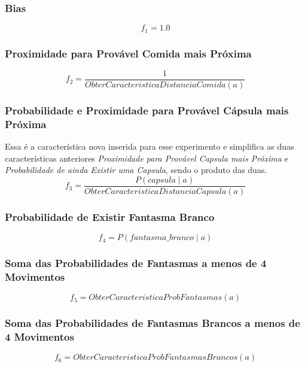 \subsubsection*{Bias}
$$ f_1 = 1.0 $$

\subsubsection*{Proximidade para Provável Comida mais Próxima}
$$ f_2 = \frac{1}{ObterCaracteristicaDistanciaComida \left( a \right)} $$

\subsubsection*{Probabilidade e Proximidade para Provável Cápsula mais Próxima }

Essa é a característica nova inserida para esse experimento e simplifica as duas características anteriores \textit{Proximidade para Provável Capsula mais Próxima} e \textit{Probabilidade de ainda Existir uma Capsula}, sendo o produto das duas.
$$ f_3 = \frac{P \left( capsula \mid a \right)}{ObterCaracteristicaDistanciaCapsula \left( a \right)} $$

\subsubsection*{Probabilidade de Existir Fantasma Branco}
$$ f_4 = P \left( fantasma\_branco \mid a \right) $$

\subsubsection*{Soma das Probabilidades de Fantasmas a menos de 4 Movimentos}
$$ f_5 = ObterCaracteristicaProbFantasmas \left( a \right) $$

\subsubsection*{Soma das Probabilidades de Fantasmas Brancos a menos de 4 Movimentos}
$$ f_6 = ObterCaracteristicaProbFantasmasBrancos \left( a \right) $$



